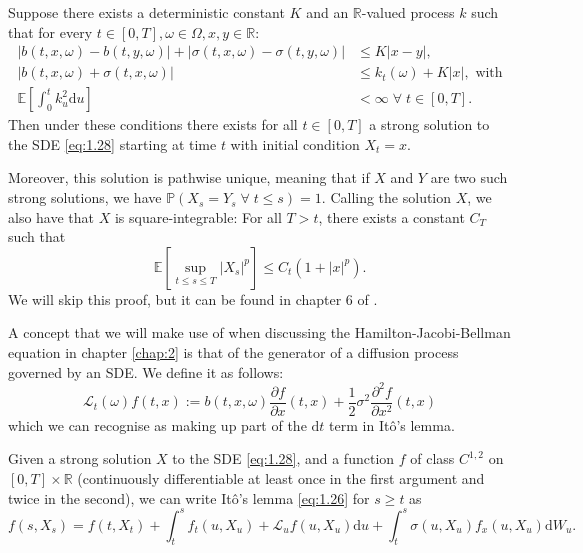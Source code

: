 \begin{theorem}\label{thm:1.6.1}
    Suppose there exists a deterministic constant $K$ and an $\mathbb{R}$-valued process
    $k$ such that for every $t\in[0,T],\omega\in\Omega,x,y\in\mathbb{R}$:
    \begin{align*}
        |b(t,x,\omega)-b(t,y,\omega)|+|\sigma(t,x,\omega)-\sigma(t,y,\omega)|&\leq K|x-y|,\\
        |b(t,x,\omega)+\sigma(t,x,\omega)|&\leq k_t(\omega)+K|x|,\textrm{ with}\\
        \mathbb{E}\left[\int_0^tk_u^2\mathrm du\right]&<\infty\;\forall\;t\in[0,T].
    \end{align*}
    Then under these conditions there exists for all $t\in[0,T]$ a strong solution 
    to the SDE \eqref{eq:1.28} starting at time $t$ with initial condition $X_t=x$.
    
    Moreover, this solution is pathwise unique, meaning that if $X$ and $Y$ are two
    such strong solutions, we have $\mathbb{P}(X_s=Y_s\;\forall\;t\leq s)=1.$ Calling 
    the solution $X$, we also have that $X$ is square-integrable: For all $T>t$, there 
    exists a constant $C_T$ such that
    \begin{equation*}
        \mathbb{E}\left[\sup_{t\leq s\leq T}|X_s|^p\right]\leq C_t(1+|x|^p).
    \end{equation*}
    We will skip this proof, but it can be found in chapter 6 of \textcite{Krylov}.
\end{theorem}

\begin{definition}
    A concept that we will make use of when discussing the Hamilton-Jacobi-Bellman equation
    in chapter \ref{chap:2} is that of the generator of a diffusion process governed by 
    an SDE. We define it as follows:
    \begin{equation}\label{eq:1.14}
        \mathcal{L}_t(\omega)f(t,x):=b(t,x,\omega)\frac{\partial f}{\partial x}(t,x)+\frac{1}{2}\sigma^2\frac{\partial^2f}{\partial x^2}(t,x)
    \end{equation}
    which we can recognise as making up part of the $\mathrm dt$ term in It\^{o}'s lemma.
\end{definition}

\begin{theorem}
    Given a strong solution $X$ to the SDE \eqref{eq:1.28}, and a function $f$ of 
    class $C^{1,2}$ on $[0,T]\times\mathbb{R}$ (continuously differentiable at least 
    once in the first argument and twice in the second), we can write It\^{o}'s lemma 
    \eqref{eq:1.26} for $s\geq t$ as 
    \begin{equation}\label{eq:1.30}
        f(s,X_s)=f(t,X_t)+\int_t^sf_t(u,X_u)+\mathcal{L}_uf(u,X_u)\mathrm du + \int_t^s\sigma(u,X_u)f_x(u,X_u)\mathrm dW_u.
    \end{equation}
\end{theorem}

